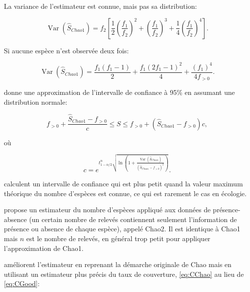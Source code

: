 \documentclass[
  11pt,
  american,
  a4paper,
  extrafontsizes,onecolumn,openright
  ]{memoir}
\begin{document}
La variance de l'estimateur est connue, mais pas sa distribution:

\begin{equation}
  \label{eq:VarChao1}
  \operatorname{Var}{\left( {\hat{S}}_\mathit{Chao1} \right)} 
  = {f_{2}}\left[ 
      \frac{1}{2}{\left( \frac{f_{1}}{f_{2}} \right)}^2 
      + {\left( \frac{f_{1}}{f_{2}} \right)}^3 
      + \frac{1}{4}{\left( \frac{f_{1}}{f_{2}} \right)}^4
    \right].
\end{equation}

Si aucune espèce n'est observée deux fois:

\begin{equation}
  \label{eq:VarChao1sansf2}
  \operatorname{Var}{\left( {\hat{S}}_\mathit{Chao1} \right)}
  = \frac{f_{1}\left(f_{1}-1\right)}{2}
    + \frac{f_{1}{\left( 2f_{1} -1 \right)}^2}{4}
    + \frac{{\left( f_{1} \right)}^4}{4f_{>0}}.
\end{equation}

\textcite{Chao1987} donne une approximation de l'intervalle de confiance à 95\% en assumant une distribution normale:

\begin{equation}
  \label{eq:ICChao1}
  f_{>0} + \frac{{\hat{S}}_\mathit{Chao1} - {f_{>0}}}{c}
  \le S
  \le {f_{>0}} + \left( {\hat{S}}_\mathit{Chao1} - {f_{>0}} \right)c,
\end{equation}

où

\begin{equation}
  \label{eq:ICChao1c}
  c = e^{
    t^{n}_{1 - \alpha / 2} \sqrt{
      \ln\left( 1 + \frac{\operatorname{Var}\left( {\hat{S}}_\mathit{Chao1} \right)}{{\left( {\hat{S}}_\mathit{Chao1} - {f_{>0}} \right)}^2} \right)
    }
  }.
\end{equation}

\textcite[eq. 8]{Eren2012} calculent un intervalle de confiance qui est plus petit quand la valeur maximum théorique du nombre d'espèces est connue, ce qui est rarement le cas en écologie.

\textcite{Chao1987} propose un estimateur du nombre d'espèces appliqué aux données de présence-absence (un certain nombre de relevés contiennent seulement l'information de présence ou absence de chaque espèce), appelé Chao2. Il est identique à Chao1 mais \(n\) est le nombre de relevés, en général trop petit pour appliquer l'approximation de Chao1.

\textcite{Chiu2014a} améliorent l'estimateur en reprenant la démarche originale de Chao mais en utilisant un estimateur plus précis du taux de couverture, \eqref{eq:CChao} au lieu de \eqref{eq:CGood}:
\end{document}
